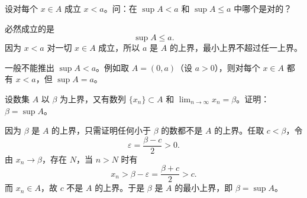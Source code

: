 \begin{xexercise}[2]
设对每个 $x\in A$ 成立 $x<a$。问：在 $\sup A<a$ 和 $\sup A\leqslant a$ 中哪个是对的？
\end{xexercise}
\begin{xsolution}
必然成立的是
\[
  \sup A\leqslant a.
\]
因为 $x<a$ 对一切 $x\in A$ 成立，所以 $a$ 是 $A$ 的上界，最小上界不超过任一上界。

一般不能推出 $\sup A<a$。例如取 $A=(0,a)$（设 $a>0$），则对每个 $x\in A$ 都有 $x<a$，但 $\sup A=a$。
\end{xsolution}


\begin{xexercise}[3]
设数集 $A$ 以 $\beta$ 为上界，又有数列 $\{x_n\}\subset A$ 和 $\lim_{n\to\infty}x_n=\beta$。证明：$\beta=\sup A$。
\end{xexercise}
\begin{xsolution}
因为 $\beta$ 是 $A$ 的上界，只需证明任何小于 $\beta$ 的数都不是 $A$ 的上界。任取 $c<\beta$，令
\[
  \varepsilon=\frac{\beta-c}{2}>0.
\]
由 $x_n\to\beta$，存在 $N$，当 $n>N$ 时有
\[
  x_n>\beta-\varepsilon=\frac{\beta+c}{2}>c.
\]
而 $x_n\in A$，故 $c$ 不是 $A$ 的上界。于是 $\beta$ 是 $A$ 的最小上界，即 $\beta=\sup A$。
\end{xsolution}


